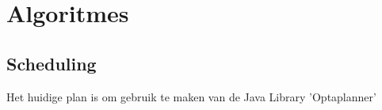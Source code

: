 \section{Algoritmes}
\label{sec:algorithms}
\subsection{Scheduling}
\label{subsec:scheduling}
Het huidige plan is om gebruik te maken van de Java Library 'Optaplanner'
